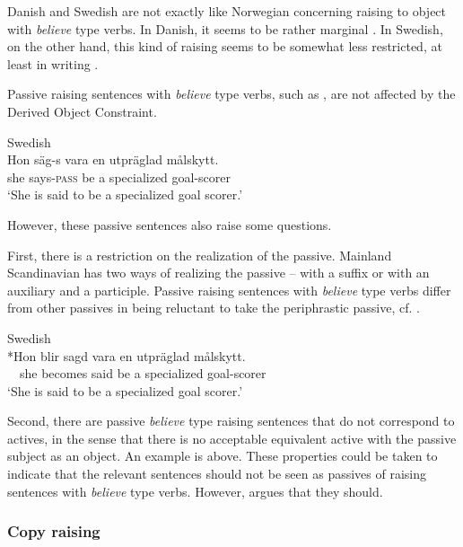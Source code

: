 \documentclass[output=paper,hidelinks]{langscibook}
\begin{document}
 Danish and Swedish are not exactly like Norwegian concerning raising to object with \textit{believe} type verbs. In Danish, it seems to be rather marginal \citep[26]{Brandt95}. In Swedish, on the other hand, this kind of raising seems to be somewhat less restricted, at least in writing \citep[576--78]{SAG3}.

 Passive raising sentences with \textit{believe} type verbs, such as , are not affected by the Derived Object Constraint.



\ea\label{ex:Scandinavian:65} Swedish \citep[583]{Ramhoj16}\\
\gll
 {Hon} {säg-s} {vara} {en} {utpräglad} {målskytt.} \\
 she says-\textsc{pass} be a specialized goal-scorer \\
\glt `She is said to be a specialized goal scorer.'\z

\noindent However, these passive sentences also raise some questions.

 First, there is a restriction on the realization of the passive. Mainland Scandinavian has two ways of realizing the passive -- with a suffix or with an auxiliary and a participle. Passive raising sentences with \textit{believe} type verbs differ from other passives in being reluctant to take the periphrastic passive, cf. .



\ea\label{ex:Scandinavian:66} Swedish \citep[583]{Ramhoj16}\\
\gll
 {*Hon} {blir} {sagd} {vara} {en} {utpräglad} {målskytt.} \\
 ~~she becomes said be a specialized goal-scorer \\
\glt `She is said to be a specialized goal scorer.'\z

Second, there are passive \textit{believe} type raising sentences that do not correspond to actives, in the sense that there is no acceptable equivalent active with the passive subject as an object. An example is  above. These properties could be taken to indicate that the relevant sentences should not be seen as passives of raising sentences with \textit{believe} type verbs. However, \citet{Ramhoj16} argues that they should.

\subsubsection{Copy raising}
\end{document}
